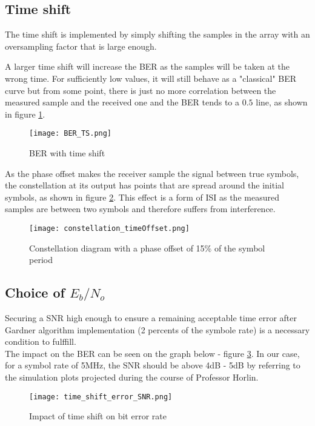 \subsection{Time shift}
The time shift is implemented by simply shifting the samples in the array with an oversampling factor that is large enough. \par
A larger time shift will increase the BER as the samples will be taken at the wrong time. For sufficiently low values, it will still behave as a "classical" BER curve but from some point, there is just no more correlation between the measured sample and the received one and the BER tends to a $0.5$ line, as shown in figure \ref{fig:BER_TS}. \par

\begin{figure}[H]
    \centering
    \texttt{[image: BER\_TS.png]}
    \caption{BER with time shift}
    \label{fig:BER_TS}
\end{figure}

As the phase offset makes the receiver sample the signal between true symbols, the constellation at its output has points that are spread around the initial symbols, as shown in figure \ref{fig:phaseShiftConst}. This effect is a form of ISI as the measured samples are between two symbols and therefore suffers from interference.

\begin{figure}[H]
    \centering
    \texttt{[image: constellation\_timeOffset.png]}
    \caption{Constellation diagram with a phase offset of 15\% of the symbol period}
    \label{fig:phaseShiftConst}
\end{figure}

\subsection{Choice of $E_{b}/N_{o}$}
Securing a SNR high enough to ensure a remaining acceptable time error after Gardner algorithm implementation
 (2 percents of the symbole rate) is a necessary condition to fulffill.\\
The impact on the BER can be seen on the graph below - figure \ref{fig:time_shift_error_SNR}.
In our case, for a symbol rate of 5MHz, the SNR should be above 4dB - 5dB by referring to the simulation plots projected 
during the course of Professor Horlin.

\begin{figure}[H]
    \centering
    \texttt{[image: time\_shift\_error\_SNR.png]}
    \caption{Impact of time shift on bit error rate}
    \label{fig:time_shift_error_SNR}
\end{figure}

